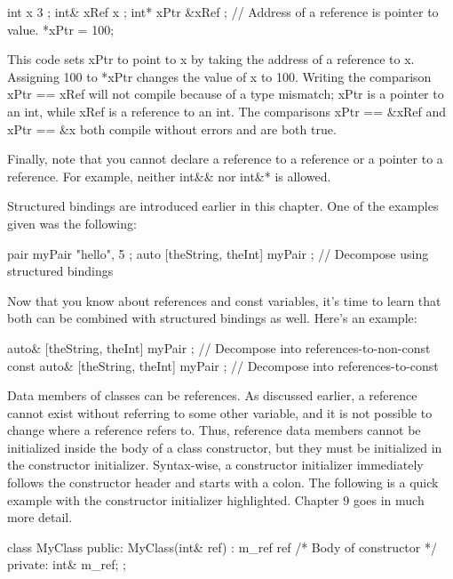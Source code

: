 \begin{cpp}
int x { 3 };
int& xRef { x };
int* xPtr { &xRef }; // Address of a reference is pointer to value.
*xPtr = 100;
\end{cpp}

This code sets xPtr to point to x by taking the address of a reference to x. Assigning 100 to *xPtr changes the value of x to 100. Writing the comparison xPtr == xRef will not compile because of a type mismatch; xPtr is a pointer to an int, while xRef is a reference to an int. The comparisons xPtr == \&xRef and xPtr == \&x both compile without errors and are both true.

Finally, note that you cannot declare a reference to a reference or a pointer to a reference. For example, neither int\&\& nor int\&* is allowed.


Structured bindings are introduced earlier in this chapter. One of the examples given was the following:

\begin{cpp}
pair myPair { "hello", 5 };
auto [theString, theInt] { myPair }; // Decompose using structured bindings
\end{cpp}

Now that you know about references and const variables, it’s time to learn that both can be combined with structured bindings as well. Here’s an example:

\begin{cpp}
auto& [theString, theInt] { myPair }; // Decompose into references-to-non-const
const auto& [theString, theInt] { myPair }; // Decompose into references-to-const
\end{cpp}


Data members of classes can be references. As discussed earlier, a reference cannot exist without referring to some other variable, and it is not possible to change where a reference refers to. Thus, reference data members cannot be initialized inside the body of a class constructor, but they must be initialized in the constructor initializer. Syntax-wise, a constructor initializer immediately follows the constructor header and starts with a colon. The following is a quick example with the constructor initializer highlighted. Chapter 9 goes in much more detail.

\begin{cpp}
class MyClass
{
    public:
        MyClass(int& ref) : m_ref { ref } { /* Body of constructor */ }
    private:
        int& m_ref;
};
\end{cpp}

